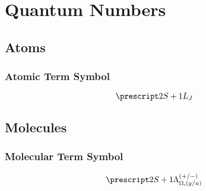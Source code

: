 \chapter{Quantum Numbers}
\label{c:quantum_numbers}

\section{Atoms}
\label{s:atoms}

\subsection{Atomic Term Symbol}

\begin{equation*}
    \state{2S + 1}{L_J}
\end{equation*}

\section{Molecules}
\label{s:molecules}

\subsection{Molecular Term Symbol}

\begin{equation*}
    \state{2S + 1}{\Lambda_{\Omega, (g/u)}^{(+/-)}}
\end{equation*}
